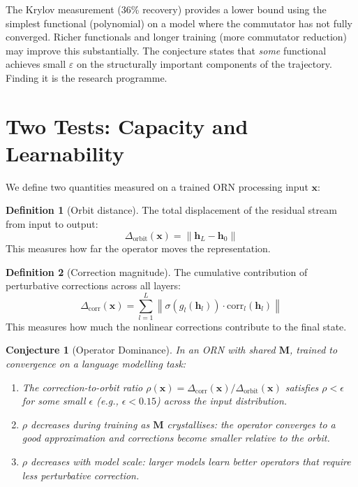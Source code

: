 \documentclass[11pt, a4paper]{article}
\newcommand{\M}{\mathbf{M}}
\newcommand{\x}{\mathbf{x}}
\newcommand{\h}{\mathbf{h}}
\newcommand{\norm}[1]{\left\| #1 \right\|}
\theoremstyle{plain}
\newtheorem{conjecture}{Conjecture}
\theoremstyle{definition}
\newtheorem{definition}{Definition}
\theoremstyle{remark}
\begin{document}
The Krylov measurement (36\% recovery) provides a lower bound using the simplest functional (polynomial) on a model where the commutator has not fully converged.
Richer functionals and longer training (more commutator reduction) may improve this substantially.
The conjecture states that \emph{some} functional achieves small $\varepsilon$ on the structurally important components of the trajectory.
Finding it is the research programme.


\section{Two Tests: Capacity and Learnability}

We define two quantities measured on a trained ORN processing input $\x$:

\begin{definition}[Orbit distance]
The total displacement of the residual stream from input to output:
\begin{equation}
\Delta_{\mathrm{orbit}}(\x) = \norm{\h_L - \h_0}
\end{equation}
This measures how far the operator moves the representation.
\end{definition}

\begin{definition}[Correction magnitude]
The cumulative contribution of perturbative corrections across all layers:
\begin{equation}
\Delta_{\mathrm{corr}}(\x) = \sum_{l=1}^{L} \norm{\sigma(g_l(\h_l)) \cdot \text{corr}_l(\h_l)}
\end{equation}
This measures how much the nonlinear corrections contribute to the final state.
\end{definition}

\begin{conjecture}[Operator Dominance]
\label{conj:dominance}
In an ORN with shared $\M$, trained to convergence on a language modelling task:
\begin{enumerate}[nosep]
\item The correction-to-orbit ratio $\rho(\x) = \Delta_{\mathrm{corr}}(\x) / \Delta_{\mathrm{orbit}}(\x)$ satisfies $\rho < \epsilon$ for some small $\epsilon$ (e.g., $\epsilon < 0.15$) across the input distribution.
\item $\rho$ decreases during training as $\M$ crystallises: the operator converges to a good approximation and corrections become smaller relative to the orbit.
\item $\rho$ decreases with model scale: larger models learn better operators that require less perturbative correction.
\end{enumerate}
\end{conjecture}
\end{document}
